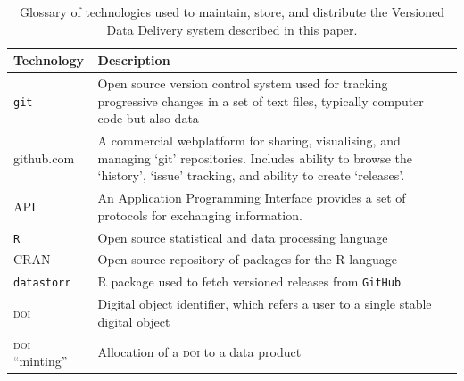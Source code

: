 \documentclass[a4paper,11pt]{article}
\begin{document}
\begin{table}[h!]
\centering
\caption{Glossary of technologies used to maintain, store, and distribute the Versioned Data Delivery system described in this paper.}
{\footnotesize
\vspace{1cm}
  \begin{tabular}{p{5cm}p{10cm}}
  \hline
  \textbf{Technology} & \textbf{Description} \\\hline
   \texttt{git} & Open source version control system used for tracking progressive changes in a set of text files, typically computer code but also data\\
   github.com & A commercial webplatform for sharing, visualising, and managing `git' repositories. Includes ability to browse the `history', `issue' tracking, and ability to create `releases'.\\
  \textsc{API}   & An Application Programming Interface provides a set of protocols for exchanging information.\\
   \texttt{R}     &  Open source statistical and data processing language \\
   \textsc{CRAN}  &  Open source repository of packages for the R language \\
   \texttt{datastorr} & R package used to fetch versioned releases from \texttt{GitHub}  \\
   \textsc{doi} & Digital object identifier, which refers a user to a single stable digital object \\
   \textsc{doi} ``minting'' & Allocation of a \textsc{doi} to a data product\\
   \hline
  \end{tabular}
  }
\label{tab:technologies}
\end{table}

\newpage
\end{document}
